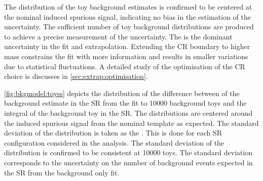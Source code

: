 The distribution of the toy background estimates is confirmed to be centered at the nominal induced spurious signal, indicating no bias in the estimation of the uncertainty. The sufficient number of toy background distributions are produced to achieve a precise measurement of the uncertainty. The \STATU is the dominant uncertainty in the fit and extrapolation. Extending the CR boundary to higher mass constrains the fit with more information and results in smaller variations due to statistical fluctuations. A detailed study of the optimisation of the CR choice is discusses in \cref{sec:extrap:optimisation}.

\cref{fig:bkgmodel:toyss} depicts the distribution of the difference between of the background estimate in the SR from the fit to 10000 background toys and the integral of the background toy in the SR. The distributions are centered around the induced spurious signal from the nominal template as expected. The standard deviation of the distribution is taken as the \STATU. This is done for each SR configuration considered in the analysis. The standard deviation of the distribution is confirmed to be consistent at 10000 toys. The standard deviation corresponds to the uncertainty on the number of background events expected in the SR from the background only fit. 


